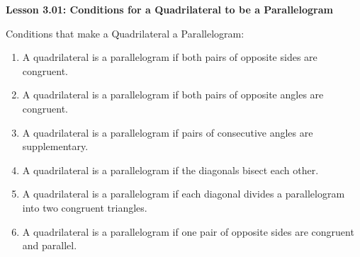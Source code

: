 \begin{center}
\textbf{Lesson 3.01: Conditions for a Quadrilateral to be a Parallelogram}
\end{center}

\vspace*{-1.5ex}

\noindent Conditions that make a Quadrilateral a Parallelogram:
\begin{enumerate}[noitemsep, label = \color{blue}\arabic*. ]
\item  A quadrilateral is a parallelogram if both pairs of opposite sides are congruent.
\item  A quadrilateral is a parallelogram if both pairs of opposite
angles are congruent.
\item  A quadrilateral is a parallelogram if pairs of consecutive angles
are supplementary.
\item  A quadrilateral is a parallelogram if the diagonals bisect each
other.
\item  A quadrilateral is a parallelogram if each diagonal divides a
parallelogram into two congruent triangles.
\item  A quadrilateral is a parallelogram if one pair of opposite sides
are congruent and parallel.
\end{enumerate}
